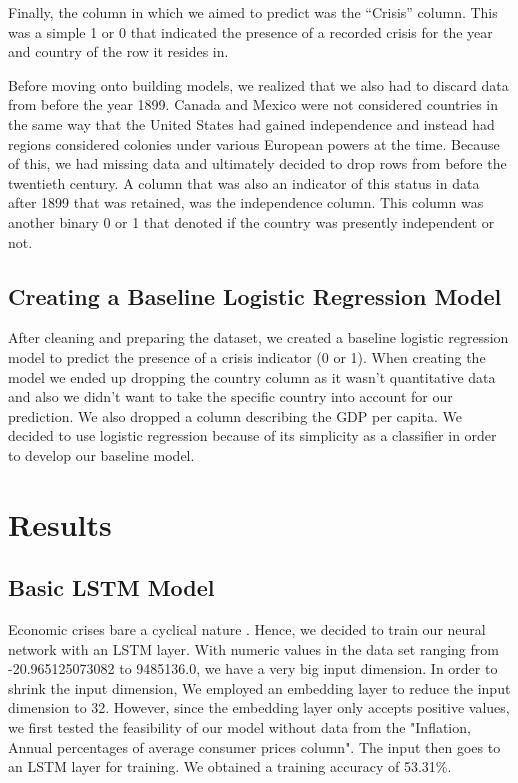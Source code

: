 \documentclass[12pt]{article}
\begin{document}
Finally, the column in which we aimed to predict was the “Crisis” column. This was a simple 1 or 0 that indicated the presence of a recorded crisis for the year and country of the row it resides in.

Before moving onto building models, we realized that we also had to discard data from before the year 1899. Canada and Mexico were not considered countries in the same way that the United States had gained independence and instead had regions considered colonies under various European powers at the time. Because of this, we had missing data and ultimately decided to drop rows from before the twentieth century. A column that was also an indicator of this status in data after 1899 that was retained, was the independence column. This column was another binary 0 or 1 that denoted if the country was presently independent or not.

\subsection{Creating a Baseline Logistic Regression Model}
After cleaning and preparing the dataset, we created a baseline logistic regression model to predict the presence of a crisis indicator (0 or 1). When creating the model we ended up dropping the country column as it wasn’t quantitative data and also we didn’t want to take the specific country into account for our prediction. We also dropped a column describing the GDP per capita. We decided to use logistic regression because of its simplicity as a classifier in order to develop our baseline model.



\section{Results}
\subsection{Basic LSTM Model}
Economic crises bare a cyclical nature \cite{10.1007/978-3-030-15577-3_11}. Hence, we decided to train our neural network with an LSTM layer. With numeric values in the data set ranging from -20.965125073082 to 9485136.0, we have a very big input dimension. In order to shrink the input dimension, We employed an embedding layer to reduce the input dimension to 32. However, since the embedding layer only accepts positive values, we first tested the feasibility of our model without data from the "Inflation, Annual percentages of average consumer prices column". The input then goes to an LSTM layer for training. We obtained a training accuracy of 53.31\%.
\end{document}

